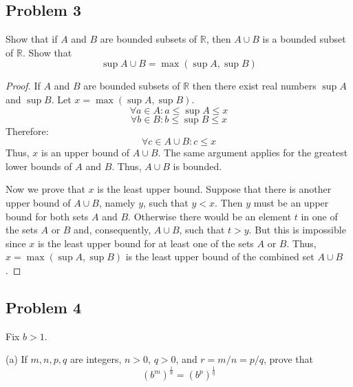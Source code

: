 \documentclass{article}
\newcommand{\R}{\mathbb{R}}
\begin{document}
\subsection*{Problem 3}

\begin{tcolorbox}
Show that if $A$ and $B$ are bounded subsets of $\R$, then $A \cup B$ is a bounded subset of $\R$.
Show that
\[ \sup A \cup B = \max (\sup A, \sup B) \]
\end{tcolorbox}

\begin{proof}

If $A$ and $B$ are bounded subsets of $\R$ then there exist real numbers $\sup A$ and $\sup B$.
Let $x = \max (\sup A, \sup B)$.
\[ \forall a \in A : a \leq \sup A \leq x \]
\[ \forall b \in B : b \leq \sup B \leq x \]
Therefore:
\[ \forall c \in A \cup B : c \leq x \]
Thus, $x$ is an upper bound of $A \cup B$.
The same argument applies for the greatest lower bounds of $A$ and $B$.
Thus, $A \cup B$ is bounded.

Now we prove that $x$ is the least upper bound.
Suppose that there is another upper bound of $A \cup B$, namely $y$, such that $y<x$.
Then $y$ must be an upper bound for both sets $A$ and $B$.
Otherwise there would be an element $t$ in one of the sets $A$ or $B$ and, consequently, $A \cup B$, such that $t > y$.
But this is impossible since $x$ is the least upper bound for at least one of the sets $A$ or $B$.
Thus, $x = \max (\sup A, \sup B)$ is the least upper bound of the combined set $A \cup B$.

\end{proof}


\subsection*{Problem 4}

\begin{tcolorbox}
Fix $b>1$.

(a) If $m, n, p, q$ are integers, $n > 0$, $q > 0$, and $r = m/n = p/q$, prove that
\begin{equation} \label{eq:1}
(b^m)^{\frac{1}{n}} = (b^p)^{\frac{1}{q}}
\end{equation}
\end{tcolorbox}
\end{document}

